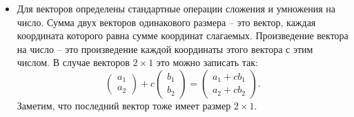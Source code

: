 \documentclass[11pt, a4paper]{extarticle}
\begin{document}
\begin{itemize}
	\item Для векторов определены стандартные операции сложения и умножения на число. Сумма двух векторов одинакового размера – это вектор, каждая координата которого равна сумме координат слагаемых. Произведение вектора на число – это произведение каждой координаты этого вектора с этим числом. В случае векторов $2\times 1$ это можно записать так:
	\[
	\begin{pmatrix}
	a_1 \\ a_2
	\end{pmatrix} + c\begin{pmatrix}
	b_1 \\ b_2
	\end{pmatrix} = \begin{pmatrix}
	a_1 + cb_1 \\ a_2 + cb_2
	\end{pmatrix}.
	\]
	Заметим, что последний вектор тоже имеет размер $2 \times 1$.
\end{itemize}
\end{document}
